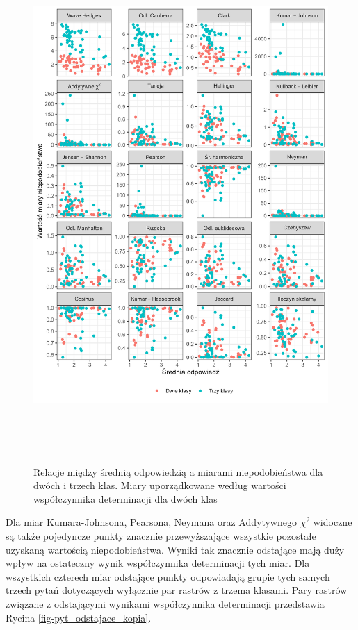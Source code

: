 \documentclass{amuthesis}
\begin{document}
\begin{figure}[t]

{\centering \includegraphics[width=5.72917in,height=7.72917in]{figures/avg_vs_measures.png}

}

\caption{\label{fig-avg_vs_measures}Relacje między średnią odpowiedzią a
miarami niepodobieństwa dla dwóch i trzech klas. Miary uporządkowane
według wartości współczynnika determinacji dla dwóch klas}

\end{figure}

Dla miar Kumara-Johnsona, Pearsona, Neymana oraz Addytywnego \(\chi^2\)
widoczne są także pojedyncze punkty znacznie przewyższające wszystkie
pozostałe uzyskaną wartością niepodobieństwa. Wyniki tak znacznie
odstające mają duży wpływ na ostateczny wynik współczynnika determinacji
tych miar. Dla wszystkich czterech miar odstające punkty odpowiadają
grupie tych samych trzech pytań dotyczących wyłącznie par rastrów z
trzema klasami. Pary rastrów związane z odstającymi wynikami
współczynnika determinacji przedstawia Rycina
\ref{fig-pyt_odstajace_kopia}.
\end{document}
